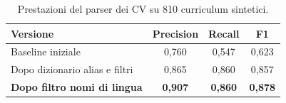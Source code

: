 \begin{table}[htbp]
  \centering
  \caption{Prestazioni del parser dei CV su 810 curriculum sintetici.}
  \label{tab:cv-parser}
  \begin{tabular}{lccc}
    \toprule
    \textbf{Versione} & \textbf{Precision} & \textbf{Recall} & \textbf{F1} \\
    \midrule
    Baseline iniziale                  & 0,760 & 0,547 & 0,623 \\
    Dopo dizionario alias e filtri     & 0,865 & 0,860 & 0,857 \\
    \textbf{Dopo filtro nomi di lingua} & \textbf{0,907} & \textbf{0,860} & \textbf{0,878} \\
    \bottomrule
  \end{tabular}
\end{table}
